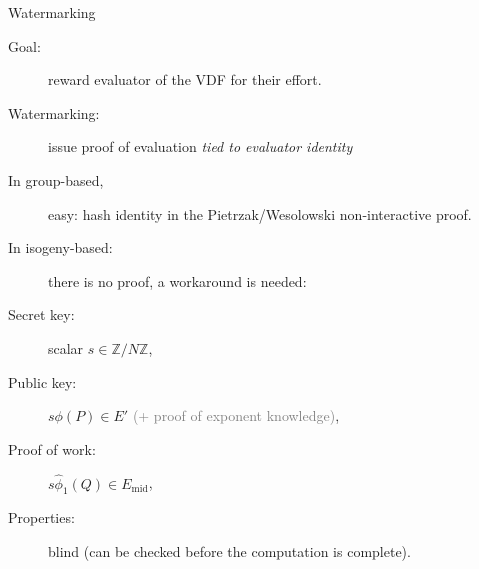\documentclass[aspectratio=169]{beamer}
\newcommand{\Z}{\mathbb{Z}}
\begin{document}
\begin{frame}{Watermarking}
  \def\Emid{E_{\mathrm{mid}}}
  \def\emid{e_{\mathrm{mid}}}
  \begin{description}
  \item[Goal:] reward evaluator of the VDF for their effort.
  \item[Watermarking:] issue proof of evaluation \emph{tied to
      evaluator identity}
  \item[In group-based,] easy: hash identity in the Pietrzak/Wesolowski
    non-interactive proof.
  \item[In isogeny-based:] there is no proof, a workaround is needed:
  \end{description}

  \centering

  \begin{description}
  \item[Secret key:] scalar $s\in\Z/N\Z$,
  \item[Public key:] $s\phi(P) \in E'$ \textcolor{gray}{(+ proof of exponent knowledge)},
  \item[Proof of work:] $s\hat\phi_1(Q) \in \Emid$,
  \item[Properties:] blind (can be checked before the computation is
    complete).
  \end{description}
\end{frame}

\end{document}
